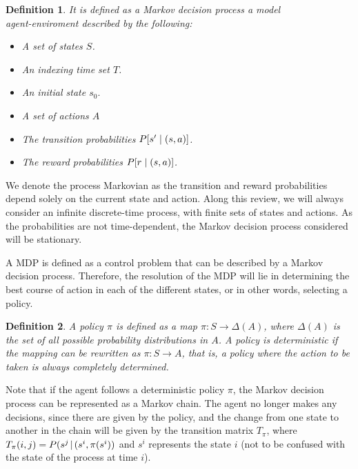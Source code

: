 \documentclass[12pt]{article}
\newtheorem{definition}{Definition}[section]
\numberwithin{equation}{section}
\begin{document}
\begin{definition}
It is defined as a Markov decision process a model \\
agent-enviroment described by the following:
\begin{itemize}
    \item A set of states $S$.
    \item An indexing time set $T$.
    \item An initial state $s_0.$
    \item A set of actions $A$
    \item  The transition probabilities \hspace{1mm}  $P[s' \hspace{1mm} | \hspace{1mm}(s,a)]$.
    \item The reward probabilities  \hspace{1mm}  $P[r \hspace{1mm} | \hspace{1mm}(s,a)]$.
\end{itemize}
\end{definition}


We denote the process Markovian as the transition and reward probabilities depend solely on the current state and action. Along this review, we will always consider an infinite discrete-time process, with finite sets of states and actions. As the probabilities are not time-dependent, the Markov decision process considered will be stationary.


A MDP is defined as a control problem that can be described by a Markov decision process. Therefore, the resolution of the MDP   will lie in determining the best course of action in each of the different states, or in other words, selecting a policy.



\begin{definition}
   A policy $\pi$ is defined as a map $\pi: S\longrightarrow \Delta(A)$, where $\Delta(A)$ is the set of all possible probability distributions in $A$. A policy is deterministic if the mapping can be rewritten as $\pi:S \longrightarrow  A$, that is, a policy where the action to be taken is always completely determined.
\end{definition}




Note that if the agent follows a deterministic policy $\pi$, the Markov decision process can be represented as a Markov chain. The agent no longer makes any decisions, since there are given by the policy, and the change from one state to another in the chain will be given by the transition matrix $T_\pi$, where $T_\pi(i,j )=P(s^j \hspace{.5mm} |\hspace{.5mm} (s^i,\pi(s^i))$ and $s^i$ represents the state $i$ (not to be confused with the state of the process at time $i$).
\end{document}
